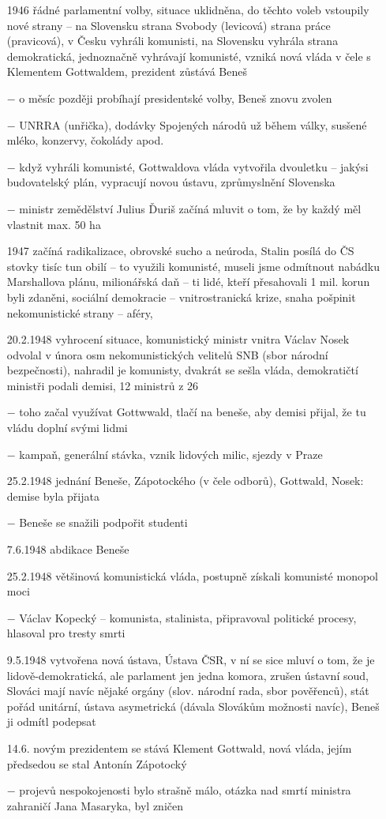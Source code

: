 \documentclass{article}
\begin{document}
\begin{itemize}
    \item[1946] řádné parlamentní volby, situace uklidněna, do těchto voleb vstoupily nové strany -- na Slovensku strana Svobody (levicová) strana práce (pravicová), v Česku vyhráli komunisti, na Slovensku vyhrála strana demokratická, jednoznačně vyhrávají komunisté, vzniká nová vláda v čele s Klementem Gottwaldem, prezident zůstává Beneš
    \item[$-$] o měsíc později probíhají presidentské volby, Beneš znovu zvolen
    \item[$-$]  UNRRA (unřička), dodávky Spojených národů už během války, susšené mléko, konzervy, čokolády apod.
    \item[$-$] když vyhráli komunisté, Gottwaldova vláda vytvořila dvouletku -- jakýsi budovatelský plán, vypracují novou ústavu, zprůmyslnění Slovenska
    \item[$-$] ministr zemědělství Julius Ďuriš začíná mluvit o tom, že by každý měl vlastnit max. 50 ha
    \item[1947] začíná radikalizace, obrovské sucho a neúroda, Stalin posílá do ČS stovky tisíc tun obilí -- to využili komunisté, museli jsme odmítnout nabádku Marshallova plánu, milionářská daň -- ti lidé, kteří přesahovali 1 mil. korun byli zdaněni, sociální demokracie -- vnitrostranická krize, snaha pošpinit nekomunistické strany -- aféry,
    \item[20.2.1948] vyhrocení situace, komunistický ministr vnitra Václav Nosek odvolal v února osm nekomunistických velitelů SNB (sbor národní bezpečnosti), nahradil je komunisty, dvakrát se sešla vláda, demokratičtí ministři podali demisi, 12 ministrů z 26
    \item[$-$] toho začal využívat Gottwwald, tlačí na beneše, aby demisi přijal, že tu vládu doplní svými lidmi
    \item[$-$] kampaň, generální stávka, vznik lidových milic, sjezdy v Praze
    \item[25.2.1948] jednání Beneše, Zápotockého (v čele odborů), Gottwald, Nosek: demise byla přijata
    \item[$-$] Beneše se snažili podpořit studenti
    \item[7.6.1948] abdikace Beneše
    \item[25.2.1948] většinová komunistická vláda, postupně získali komunisté monopol moci
    \item[$-$] Václav Kopecký -- komunista, stalinista, připravoval politické procesy, hlasoval pro tresty smrti
    \item[9.5.1948] vytvořena nová ústava, Ústava ČSR, v ní se sice mluví o tom, že je lidově-demokratická, ale parlament jen jedna komora, zrušen ústavní soud, Slováci mají navíc nějaké orgány (slov. národní rada, sbor pověřenců), stát pořád unitární, ústava asymetrická (dávala Slovákům možnosti navíc), Beneš ji odmítl podepsat
    \item[14.6.] novým prezidentem se stává Klement Gottwald, nová vláda, jejím předsedou se stal Antonín Zápotocký
    \item[$-$] projevů nespokojenosti bylo strašně málo, otázka nad smrtí ministra zahraničí Jana Masaryka, byl zničen
\end{itemize}
\end{document}

